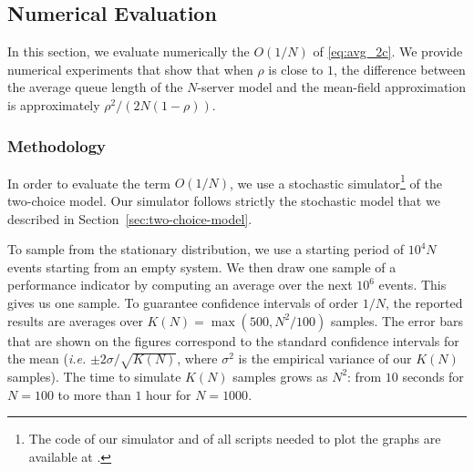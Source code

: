 \documentclass[sigconf]{acmart}
\begin{document}
\subsection{Numerical Evaluation}

In this section, we evaluate numerically the $O(1/N)$ of
\eqref{eq:avg_2c}. We provide numerical experiments that show that
when $\rho$ is close to $1$, the difference between the average queue
length of the $N$-server model and the mean-field approximation is
approximately $\rho^2/(2N(1-\rho))$.

\subsubsection{Methodology}

In order to evaluate the term $O(1/N)$, we use a stochastic
simulator\footnote{The code of our simulator and of all scripts needed
  to plot the graphs are available at \githublink.} of the two-choice
model. Our simulator follows strictly the stochastic model that we
described in Section~\ref{sec:two-choice-model}.

To sample from the stationary distribution, we use a starting period
of $10^4N$ events starting from an empty system. We then draw one
sample of a performance indicator by computing an average over the
next $10^6$ events. This gives us one sample. To guarantee confidence
intervals of order $1/N$, the reported results are averages over
$K(N)=\max(500,N^2/100)$ samples. The error bars that are shown on the
figures correspond to the standard confidence intervals for the mean
(\emph{i.e.} $\pm2\sigma/\sqrt{K(N)}$, where $\sigma^2$ is the
empirical variance of our $K(N)$ samples).  The time to simulate
$K(N)$ samples grows as $N^2$: from $10$ seconds for $N=100$ to more
than $1$ hour for $N=1000$.
\end{document}

